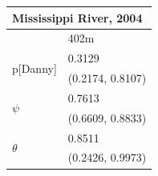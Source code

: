 \documentclass[12pt]{article}
\begin{document}
\begin{table}
    \begin{center}
    \begin{tabular}{|l|l|}
        \hline
        \multicolumn{2}{|l|}{\textbf{Mississippi River, 2004}} \\
        \hline
            & 402m \\
        \hline
        \multirow{2}{*}{p[Danny]}
            & 0.3129 \\
            & (0.2174, 0.8107) \\
        \hline
        \multirow{2}{*}{\(\psi\)}
            & 0.7613 \\
            & (0.6609, 0.8833) \\
        \hline
        \multirow{2}{*}{\(\theta\)}
            & 0.8511 \\
            & (0.2426, 0.9973) \\
        \hline
    \end{tabular}
    \end{center}
    \end{table}
\end{document}
